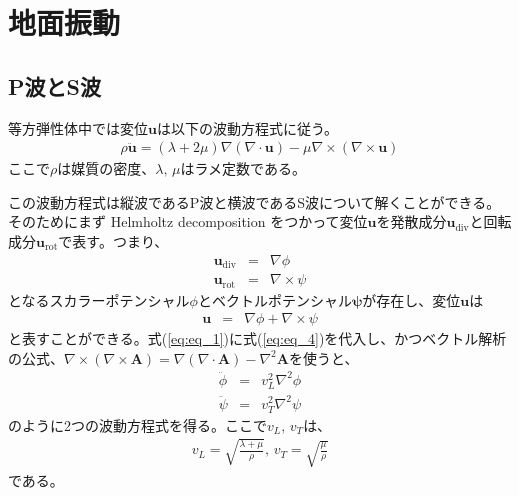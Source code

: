 
\section{地面振動}

\subsection{P波とS波}

等方弾性体中では変位$\bm{u}$は以下の波動方程式に従う。
\begin{eqnarray}\label{eq:eq_1}
  \rho{\bm{\ddot{u}}} = (\lambda+2\mu)\nabla(\nabla\cdot\bm{u}) - \mu\nabla\times(\nabla\times\bm{u})
\end{eqnarray}
ここで$\rho$は媒質の密度、$\lambda,\,\mu$はラメ定数である。

この波動方程式は縦波であるP波と横波であるS波について解くことができる。そのためにまず Helmholtz decomposition をつかって変位$\bm{u}$を発散成分$\bm{u}_{\mathrm{div}}$と回転成分$\bm{u}_{\mathrm{rot}}$で表す。つまり、
\begin{eqnarray}
  \bm{u}_{\mathrm{div}}&=&\nabla\phi \label{eq:eq_2}\\
  \bm{u}_{\mathrm{rot}}&=&\nabla\times\psi \label{eq:eq_3}
\end{eqnarray}
となるスカラーポテンシャル$\phi$とベクトルポテンシャル$\bm{\psi}$が存在し、変位$\bm{u}$は
\begin{eqnarray} 
  \bm{u} &=& \nabla\phi + \nabla\times\psi \label{eq:eq_4}
\end{eqnarray}
と表すことができる。式(\ref{eq:eq_1})に式(\ref{eq:eq_4})を代入し、かつベクトル解析の公式、$\nabla\times(\nabla\times\bm{A})=\nabla(\nabla\cdot\bm{A})-\nabla^2{\bm{A}}$を使うと、
\begin{eqnarray}
  \ddot{\phi} &=& v_{L}^2\nabla^2\phi \label{eq:eq_5}\\
  \ddot{\psi} &=& v_{T}^2\nabla^2\psi \label{eq:eq_6}
\end{eqnarray} 
のように2つの波動方程式を得る。ここで$v_{L},\,v_{T}$は、
\begin{eqnarray}
  v_{L} = \sqrt{\frac{\lambda+\mu}{\rho}},\,v_{T} = \sqrt{\frac{\mu}{\rho}} \label{eq:eq_7}
\end{eqnarray} 
である。

